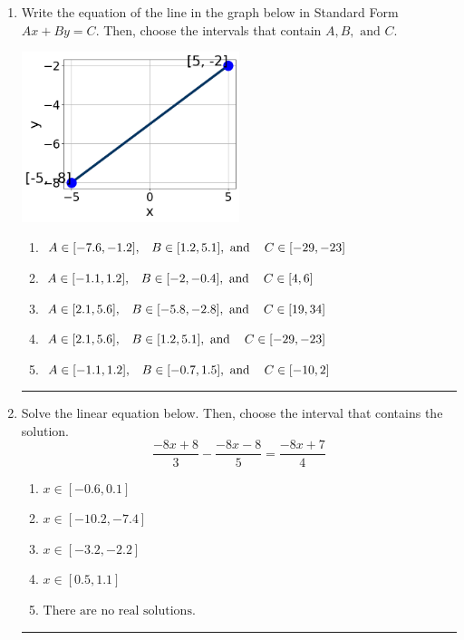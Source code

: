 \documentclass[14pt]{extbook}
\newcommand{\litem}[1]{\item#1\hspace*{-1cm}\rule{\textwidth}{0.4pt}}
\begin{document}
\begin{enumerate}
{\begin{enumerate}[label=\Alph*.]
\end{enumerate} }
\litem{
Write the equation of the line in the graph below in Standard Form $Ax+By=C$. Then, choose the intervals that contain $A, B, \text{ and } C$.
\begin{center}
    \includegraphics[width=0.5\textwidth]{../Figures/linearGraphToStandardC.png}
\end{center}
\begin{enumerate}[label=\Alph*.]
\item \( A \in [-7.6, -1.2], \hspace{3mm} B \in [1.2, 5.1], \text{ and } \hspace{3mm} C \in [-29, -23] \)
\item \( A \in [-1.1, 1.2], \hspace{3mm} B \in [-2, -0.4], \text{ and } \hspace{3mm} C \in [4, 6] \)
\item \( A \in [2.1, 5.6], \hspace{3mm} B \in [-5.8, -2.8], \text{ and } \hspace{3mm} C \in [19, 34] \)
\item \( A \in [2.1, 5.6], \hspace{3mm} B \in [1.2, 5.1], \text{ and } \hspace{3mm} C \in [-29, -23] \)
\item \( A \in [-1.1, 1.2], \hspace{3mm} B \in [-0.7, 1.5], \text{ and } \hspace{3mm} C \in [-10, 2] \)

\end{enumerate} }
\litem{
Solve the linear equation below. Then, choose the interval that contains the solution.\[ \frac{-8x + 8}{3} - \frac{-8x -8}{5} = \frac{-8x + 7}{4} \]\begin{enumerate}[label=\Alph*.]
\item \( x \in [-0.6, 0.1] \)
\item \( x \in [-10.2, -7.4] \)
\item \( x \in [-3.2, -2.2] \)
\item \( x \in [0.5, 1.1] \)
\item \( \text{There are no real solutions.} \)


\end{enumerate}}
\end{enumerate}
\end{document}
